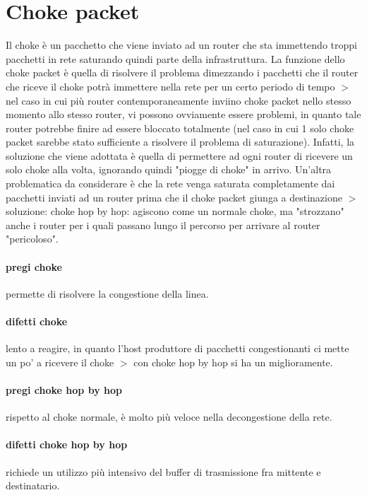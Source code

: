 \documentclass{article}
\begin{document}
\section{Choke packet}

Il choke è un pacchetto che viene inviato ad un router che sta immettendo troppi
pacchetti in rete saturando quindi parte della infrastruttura. La funzione dello
choke packet è quella di risolvere il problema dimezzando i pacchetti che il
router che riceve il choke potrà immettere nella rete per un certo periodo di
tempo $>$ nel caso in cui più router contemporaneamente inviino choke packet
nello stesso momento allo stesso router, vi possono ovviamente essere problemi,
in quanto tale router potrebbe finire ad essere bloccato totalmente (nel caso in
cui 1 solo choke packet sarebbe stato sufficiente a risolvere il problema di
saturazione). Infatti, la soluzione che viene adottata è quella di permettere ad
ogni router di ricevere un solo choke alla volta, ignorando quindi "piogge di
choke" in arrivo. Un'altra problematica da considerare è che la rete venga
saturata completamente dai pacchetti inviati ad un router prima che il choke
packet giunga a destinazione $>$ soluzione: choke hop by hop: agiscono come un
normale choke, ma "strozzano" anche i router per i quali passano lungo il
percorso per arrivare al router "pericoloso".

\paragraph{pregi choke} permette di risolvere la congestione della linea.

\paragraph{difetti choke} lento a reagire, in quanto l'host produttore di
pacchetti congestionanti ci mette un po' a ricevere il choke $>$ con choke hop
by hop si ha un miglioramente.

\paragraph{pregi choke hop by hop} rispetto al choke normale, è molto più veloce
nella decongestione della rete.

\paragraph{difetti choke hop by hop} richiede un utilizzo più intensivo del
buffer di trasmissione fra mittente e destinatario.
\end{document}
